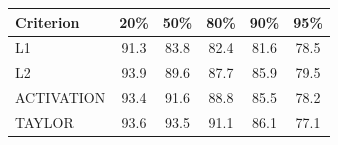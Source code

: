 \begin{tabular}{lccccc}\toprule
Criterion & 20\% & 50\% & 80\% & 90\% & 95\%\\\midrule
L1 & 91.3 & 83.8 & 82.4 & 81.6 & 78.5\\
L2 & 93.9 & 89.6 & 87.7 & 85.9 & 79.5\\
ACTIVATION & 93.4 & 91.6 & 88.8 & 85.5 & 78.2\\
TAYLOR & 93.6 & 93.5 & 91.1 & 86.1 & 77.1\\
\bottomrule\end{tabular}